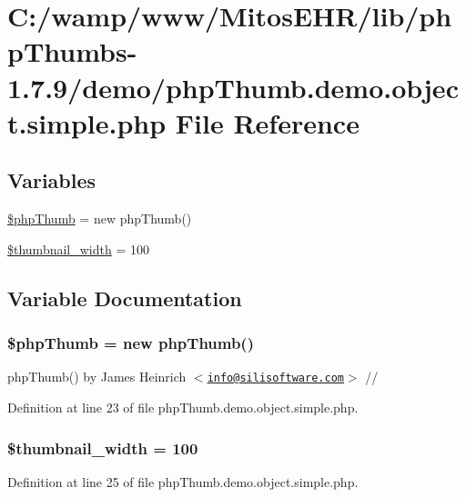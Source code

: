 \hypertarget{php_thumb_8demo_8object_8simple_8php}{\section{\-C\-:/wamp/www/\-Mitos\-E\-H\-R/lib/php\-Thumbs-\/1.7.9/demo/php\-Thumb.demo.\-object.\-simple.\-php \-File \-Reference}
\label{php_thumb_8demo_8object_8simple_8php}
}
\subsection*{\-Variables}
\begin{DoxyCompactItemize}
\item 
\hyperlink{php_thumb_8demo_8object_8simple_8php_a1102b627fc78f79861c9271417c605c5}{\$php\-Thumb} = new php\-Thumb()
\item 
\hyperlink{php_thumb_8demo_8object_8simple_8php_a5f47454ad3ff8c9fb39f4269449ee35d}{\$thumbnail\-\_\-width} = 100
\end{DoxyCompactItemize}


\subsection{\-Variable \-Documentation}
\hypertarget{php_thumb_8demo_8object_8simple_8php_a1102b627fc78f79861c9271417c605c5}{
\subsubsection[{\$php\-Thumb}]{\setlength{\rightskip}{0pt plus 5cm}\$php\-Thumb = new php\-Thumb()}}\label{php_thumb_8demo_8object_8simple_8php_a1102b627fc78f79861c9271417c605c5}
php\-Thumb() by \-James \-Heinrich $<$\href{mailto:info@silisoftware.com}{\tt info@silisoftware.\-com}$>$ // 

\-Definition at line 23 of file php\-Thumb.\-demo.\-object.\-simple.\-php.

\hypertarget{php_thumb_8demo_8object_8simple_8php_a5f47454ad3ff8c9fb39f4269449ee35d}{
\subsubsection[{\$thumbnail\-\_\-width}]{\setlength{\rightskip}{0pt plus 5cm}\$thumbnail\-\_\-width = 100}}\label{php_thumb_8demo_8object_8simple_8php_a5f47454ad3ff8c9fb39f4269449ee35d}


\-Definition at line 25 of file php\-Thumb.\-demo.\-object.\-simple.\-php.

